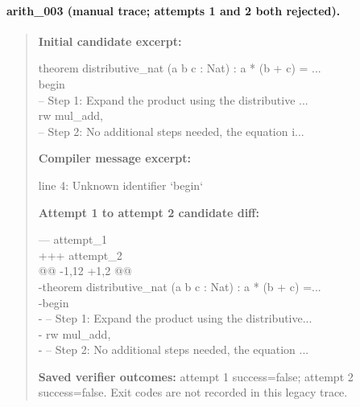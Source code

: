 \paragraph{arith\_003 (manual trace; attempts 1 and 2 both rejected).}
\begin{quote}\small
\textbf{Initial candidate excerpt:}\par\ttfamily
theorem distributive\_nat (a b c : Nat) : a * (b + c) = ...\\
begin\\
  -- Step 1: Expand the product using the distributive ...\\
  rw mul\_add,\\
  -- Step 2: No additional steps needed, the equation i...\\
\par\textbf{Compiler message excerpt:}\par\ttfamily
line 4: Unknown identifier `begin`\\
\par\textbf{Attempt 1 to attempt 2 candidate diff:}\par\ttfamily
--- attempt\_1\\
+++ attempt\_2\\
@@ -1,12 +1,2 @@\\
-theorem distributive\_nat (a b c : Nat) : a * (b + c) =...\\
-begin\\
-  -- Step 1: Expand the product using the distributive...\\
-  rw mul\_add,\\
-  -- Step 2: No additional steps needed, the equation ...\\
\par\textbf{Saved verifier outcomes:} attempt 1 success=false; attempt 2 success=false. Exit codes are not recorded in this legacy trace.
\end{quote}
